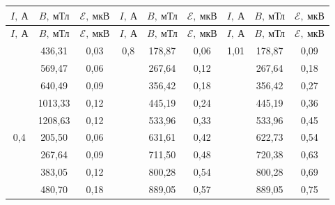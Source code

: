\begin{longtable}{|c|c|c||c|c|c||c|c|c|}
\hline
$I, \ \text{А}$ & $B, \ \text{мТл}$
& $\mathscr{E}, \ \text{мкВ}$    & $I, \ \text{А}$
& $B, \ \text{мТл}$          & $\mathscr{E}, \ \text{мкВ}$    & $I, \ \text{А}$
& $B, \ \text{мТл}$          & $\mathscr{E}, \ \text{мкВ}$    \\ \hline
\endfirsthead
\hline
$I, \ \text{А}$ & $B, \ \text{мТл}$
& $\mathscr{E}, \ \text{мкВ}$    & $I, \ \text{А}$
& $B, \ \text{мТл}$          & $\mathscr{E}, \ \text{мкВ}$    & $I, \ \text{А}$
& $B, \ \text{мТл}$          & $\mathscr{E}, \ \text{мкВ}$    \\ \hline
	\endhead
	\hline
	\endfoot
	\endlastfoot

\multirow{5}{*}{0,2}   & 436,31  & 0,03 & \multirow{12}{*}{0,8} & 178,87  & 0,06 & \multirow{12}{*}{1,01} & 178,87  & 0,09 \\ \cline{2-3} \cline{5-6} \cline{8-9} 
                       & 569,47  & 0,06 &                       & 267,64  & 0,12 &                        & 267,64  & 0,18 \\ \cline{2-3} \cline{5-6} \cline{8-9} 
                       & 640,49  & 0,09 &                       & 356,42  & 0,18 &                        & 356,42  & 0,27 \\ \cline{2-3} \cline{5-6} \cline{8-9} 
                       & 1013,33 & 0,12 &                       & 445,19  & 0,24 &                        & 445,19  & 0,36 \\ \cline{2-3} \cline{5-6} \cline{8-9} 
                       & 1208,63 & 0,12 &                       & 533,96  & 0,33 &                        & 533,96  & 0,45 \\ \cline{1-3} \cline{5-6} \cline{8-9} 
\multirow{8}{*}{0,4}   & 205,50  & 0,06 &                       & 631,61  & 0,42 &                        & 622,73  & 0,54 \\ \cline{2-3} \cline{5-6} \cline{8-9} 
                       & 267,64  & 0,09 &                       & 711,50  & 0,48 &                        & 720,38  & 0,63 \\ \cline{2-3} \cline{5-6} \cline{8-9} 
                       & 383,05  & 0,12 &                       & 800,28  & 0,54 &                        & 800,28  & 0,69 \\ \cline{2-3} \cline{5-6} \cline{8-9} 
                       & 480,70  & 0,18 &                       & 889,05  & 0,57 &                        & 889,05  & 0,75 \\ \cline{2-3} \cline{5-6} \cline{8-9} 

\end{longtable}
